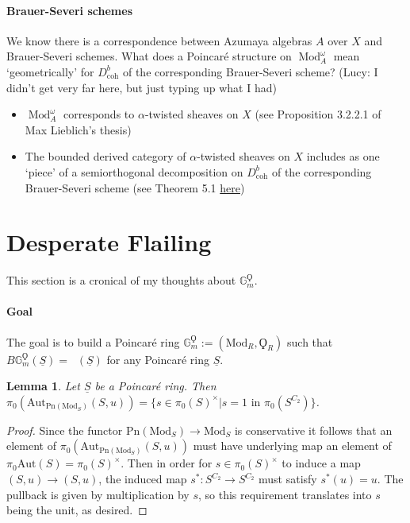 \documentclass{article}
\DeclareMathOperator{\Mod}{Mod} %
\DeclareMathOperator{\Picp}{Pic^p} %
\newtheorem{lemma}[equation]{Lemma}
\theoremstyle{definition}
\begin{document}
\paragraph{Brauer-Severi schemes} 
We know there is a correspondence between Azumaya algebras $ A $ over $ X $ and Brauer-Severi schemes. 
What does a Poincaré structure on $ \Mod_A^\omega $ mean `geometrically' for $ D^b_{\mathrm{coh}} $ of the corresponding Brauer-Severi scheme? 
(Lucy: I didn't get very far here, but just typing up what I had)
\begin{itemize}
    \item $ \Mod_A^\omega $ corresponds to $ \alpha $-twisted sheaves on $ X $ (see Proposition 3.2.2.1 of Max Lieblich's thesis)
    \item The bounded derived category of $ \alpha $-twisted sheaves on $ X $ includes as one `piece' of a semiorthogonal decomposition on $ D^b_{\mathrm{coh}} $ of the corresponding Brauer-Severi scheme (see Theorem 5.1 \href{https://arxiv.org/abs/math/0511497}{here})
\end{itemize}

\section{Desperate Flailing}

This section is a cronical of my thoughts about $\mathbb{G}_m^\Qoppa$.
\paragraph{Goal} The goal is to build a Poincar{\'e} ring $\mathbb{G}_{m}^\Qoppa:=(\mathrm{Mod}_R, \Qoppa_R)$  such that $B\mathbb{G}_m^\Qoppa(\underline{S}) = \Picp(\underline{S})$ for any Poincar{\'e} ring $\underline{S}$.
\begin{lemma}
Let $\underline{S}$ be a Poincar{\'e} ring. Then $\pi_0(\mathrm{Aut}_{\mathrm{Pn}(\mathrm{Mod}_S)}(S,u))=\{s\in \pi_0(S)^\times | s=1 \textrm{ in }\pi_0(S^{C_2})\}$.
\end{lemma}
\begin{proof}
Since the functor $\mathrm{Pn}(\mathrm{Mod}_S)\to \mathrm{Mod}_S$ is conservative it follows that an element of $\pi_0(\mathrm{Aut}_{\mathrm{Pn}(\mathrm{Mod}_S)}(S,u))$ must have underlying map an element of $\pi_0\mathrm{Aut}(S)=\pi_0(S)^\times$. Then in order for $s\in \pi_0(S)^\times$ to induce a map $(S,u)\to (S,u)$, the induced map $s^*:S^{C_2}\to S^{C_2}$ must satisfy $s^*(u)=u$. The pullback is given by multiplication by $s$, so this requirement translates into $s$ being the unit, as desired.
\end{proof}
\end{document}
